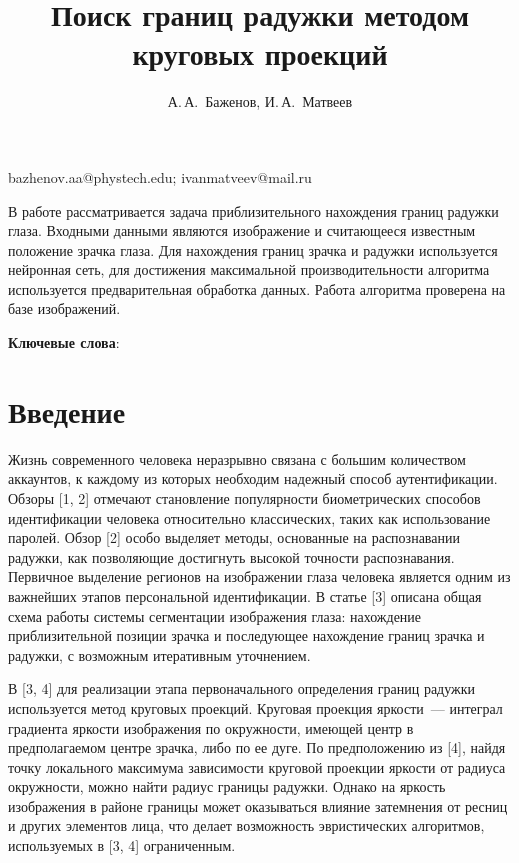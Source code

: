 \documentclass[12pt, twoside]{article}
\begin{document}
\title
    {Поиск границ радужки методом круговых проекций} %
\author
    {А.\,А.~Баженов, И.\,А.~Матвеев} %
\email
    {bazhenov.aa@phystech.edu; ivanmatveev@mail.ru}
\abstract
    {В работе рассматривается задача приблизительного нахождения границ радужки глаза. Входными данными являются изображение и считающееся известным положение зрачка глаза. Для нахождения границ зрачка и радужки используется нейронная сеть, для достижения максимальной производительности алгоритма используется предварительная обработка данных. Работа алгоритма проверена на базе изображений.
	
\bigskip
\noindent
\textbf{Ключевые слова}: \emph {}

}


\maketitle
\linenumbers

\section{Введение}
Жизнь современного человека неразрывно связана с большим количеством аккаунтов, к каждому из которых необходим надежный способ аутентификации. Обзоры [1, 2] отмечают становление популярности биометрических способов идентификации человека относительно классических, таких как использование паролей. Обзор [2] особо выделяет методы, основанные на распознавании радужки, как позволяющие достигнуть высокой точности распознавания. Первичное выделение регионов на изображении глаза человека является одним из важнейших этапов персональной идентификации. В статье [3] описана общая схема работы системы сегментации изображения глаза: нахождение приблизительной позиции зрачка и последующее нахождение границ зрачка и радужки, с возможным итеративным уточнением.

В [3, 4] для реализации этапа первоначального определения границ радужки  используется метод круговых проекций. Круговая проекция яркости~--- интеграл градиента яркости изображения по окружности, имеющей центр в предполагаемом центре зрачка, либо по ее дуге. По предположению из [4], найдя точку локального максимума зависимости круговой проекции яркости от радиуса окружности, можно найти радиус границы радужки. Однако на яркость изображения в районе границы может оказываться влияние затемнения от ресниц и других элементов лица, что делает возможность эвристических алгоритмов, используемых в [3, 4] ограниченным.
\end{document}
